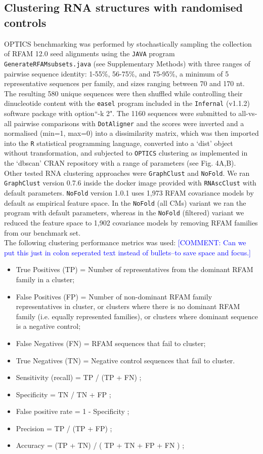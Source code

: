 \documentclass{bmcart}
\newcommand\dotaligner{\texttt{DotAligner}}
\newcommand\graphclust{\texttt{GraphClust}}
\newcommand\nofold{\texttt{NoFold}}
\begin{document}
\subsection*{Clustering RNA structures with randomised controls}
OPTICS benchmarking was performed by stochastically sampling the collection of RFAM 12.0 
seed alignments using the \texttt{JAVA} program \texttt{GenerateRFAMsubsets.java} (see Supplementary Methods) with three ranges of pairwise sequence identity: 1-55\%, 56-75\%, and 75-95\%, a minimum of 5 representative sequences per family, and sizes ranging between 70 and 170 nt.   
The resulting 580 unique sequences were then shuffled while controlling their dinucleotide content with 
the \texttt{easel} program included in the \texttt{Infernal} (v1.1.2) software package 
\cite{nawrocki2013infernal} with option``-k 2". The 1160 sequences were submitted to 
all-vs-all pairwise comparisons with \dotaligner{} and the scores were inverted and a 
normalised (min=1, max=0) into a dissimilarity matrix, which was then imported into
the \texttt{R} statistical programming language, converted into a `dist' object without
transformation, and subjected to \texttt{OPTICS} clustering as implemented
in the `dbscan' CRAN repository with a range of parameters (see Fig. 4A,B).\\

Other tested RNA clustering approaches were \graphclust{} and \nofold. We ran \graphclust{} version 0.7.6 inside the docker image provided with \texttt{RNAscClust} with default parameters. \nofold{} version 1.0.1 uses 1,973 RFAM covariance models by default as empirical feature space. In the \nofold{} (all CMs) variant we ran the program with default parameters, whereas in the \nofold{} (filtered) variant we reduced the feature space to 1,902 covariance models by removing RFAM families from our benchmark set. \\ 

The following clustering performance metrics was used:  \textcolor{blue}{[COMMENT: Can we put this just in colon seperated text instead of bullets--to save space and focus.]}
\begin{itemize}
\item True Positives (TP) = Number of representatives from the dominant RFAM family in a cluster;
\item False Positives (FP) = Number of non-dominant RFAM family representatives in cluster, or clusters
where there is no dominant RFAM family (i.e. equally represented families), or clusters where dominant sequence is a negative control;
\item False Negatives (FN) = RFAM sequences that fail to cluster; 
\item True Negatives (TN) = Negative control sequences that fail to cluster. 
\item Sensitivity (recall) = TP  / (TP + FN) ;
\item Specificity  = TN / TN + FP ;
\item False positive rate =  1 - Specificity ;
\item Precision = TP / (TP + FP) ;
\item Accuracy = (TP + TN) / ( TP + TN + FP + FN )  ; 
\end{itemize}
\end{document}
